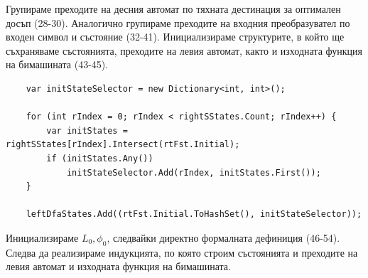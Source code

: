 \documentclass[12pt, oneside]{article}
\theoremstyle{definition}
\begin{document}
Групираме преходите на десния автомат по тяхната дестинация за оптимален досъп (28-30). Аналогично групираме преходите на входния преобразувател по входен символ и състояние (32-41). Инициализираме структурите, в който ще съхраняваме състоянията, преходите на левия автомат, както и изходната функция на бимашината (43-45).

\begin{verbatim}
    var initStateSelector = new Dictionary<int, int>();

    for (int rIndex = 0; rIndex < rightSStates.Count; rIndex++) {
        var initStates = rightSStates[rIndex].Intersect(rtFst.Initial);
        if (initStates.Any())
            initStateSelector.Add(rIndex, initStates.First());
    }

    leftDfaStates.Add((rtFst.Initial.ToHashSet(), initStateSelector));
\end{verbatim}

Инициализираме \( L_0, \phi_0 \), следвайки директно формалната дефиниция (46-54). Следва да реализираме индукцията, по която строим състоянията и преходите на левия автомат и изходната функция на бимашината.
\end{document}
